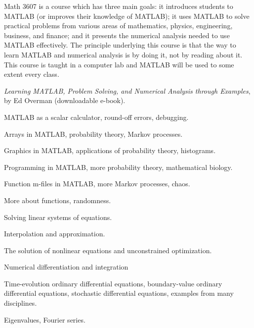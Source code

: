 \documentclass{osucourse}
\begin{document}
\CatalogDescription
\PrerequisitesAndExclusions

\begin{Purpose}
Math 3607 is a course which has three main goals: it introduces students to MATLAB (or improves their knowledge of MATLAB); it uses MATLAB to solve practical problems from various areas of mathematics, physics, engineering, business, and finance; and it presents the numerical analysis needed to use MATLAB effectively. The principle underlying this course is that the way to learn MATLAB and numerical analysis is by doing it, not by reading about it. This course is taught in a computer lab and MATLAB will be used to some extent every class.
\end{Purpose}

\begin{Text}
\emph{Learning MATLAB, Problem Solving, and Numerical Analysis through Examples}, by Ed Overman (downloadable e-book).
\end{Text}

\begin{TopicsList}
\item MATLAB as a scalar calculator, round-off errors, debugging.
\item Arrays in MATLAB, probability theory, Markov processes.
\item Graphics in MATLAB, applications of probability theory, histograms.
\item Programming in MATLAB, more probability theory, mathematical biology.
\item Function m-files in MATLAB, more Markov processes, chaos.
\item More about functions, randomness.
\item Solving linear systems of equations.
\item Interpolation and approximation.
\item The solution of nonlinear equations and unconstrained optimization.
\item Numerical differentiation and integration
\item Time-evolution ordinary differential equations, boundary-value ordinary differential equations, stochastic differential equations, examples from many disciplines.
\item Eigenvalues, Fourier series.
\end{TopicsList}
\end{document}
